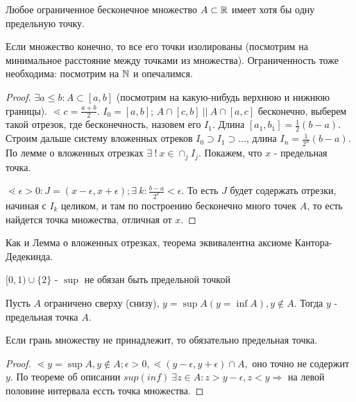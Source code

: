 \documentclass[12pt]{report}
\begin{document}
\begin{thm}
Любое ограниченное бесконечное множество $A \subset \mathbb{R}$ имеет хотя бы одну предельную точку.
\end{thm}
\begin{note}
Если множество конечно, то все его точки изолированы (посмотрим на минимальное расстояние между точками из множества). Ограниченность тоже необходима: посмотрим на $\mathbb{N}$ и опечалимся.
\end{note}
\begin{proof}
$\exists a \le b: A \subset [a, b]$ (посмотрим на какую-нибудь верхнюю и нижнюю границы). $\lessdot c = \frac{a + b}{2}$. $I_0 = [a, b]$; $A \cap [c, b] ~|| ~A\cap [a, c]$ бесконечно, выберем такой отрезок, где бесконечность, назовем его $I_1$. Длина $[a_1, b_1] = \frac{1}{2}(b - a)$. Строим дальше систему вложенных отреков $I_0 \supset I_1 \supset \dots $, длина $I_n = \frac{1}{2^n}(b - a)$. По лемме о вложенных отрезках $\exists ~! ~x \in \cap_j I_j$. Покажем, что $x$ - предельная точка.

$\lessdot \epsilon > 0: J = (x - \epsilon, x + \epsilon); \exists ~k: \frac{b - a}{2^k} < \epsilon$. То есть $J$ будет содержать отрезки, начиная с $I_k$ целиком, и там по построению бесконечно много точек $A$, то есть найдется точка множества, отличная от $x$.
\end{proof}

\begin{note}
Как и Лемма о вложенных отрезках, теорема эквивалентна аксиоме Кантора-Дедекинда. 
\end{note}

\begin{ex}
$[0, 1)\cup \{2\}$ - $\sup$ не обязан быть предельной точкой
\end{ex}

\begin{lm}
Пусть $A$ ограничено сверху (снизу), $y = \sup{A} (y = \inf{A}), y \notin A$. Тогда $y$ - предельная точка $A$.

Если грань множеству не принадлежит, то обязательно предельная точка.
\end{lm}
\begin{proof}
$\lessdot y = \sup{A}, y \notin A; \epsilon > 0, \lessdot (y - \epsilon, y + \epsilon) \cap A,$ оно точно не содержит $y$. По теореме об описании $sup (inf) ~\exists z \in A: z > y - \epsilon, z < y \Rightarrow$ на левой половине интервала ессть точка множества.
\end{proof}
\end{document}
